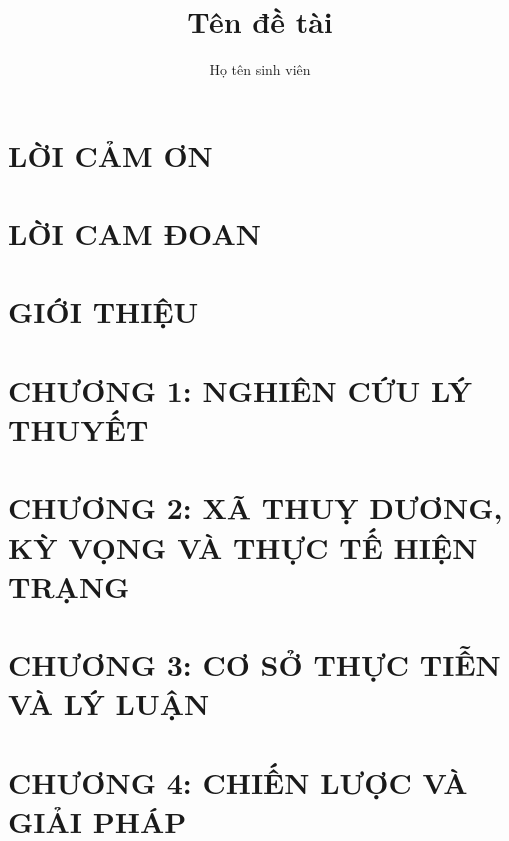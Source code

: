 \documentclass[a4paper,14pt,oneside]{extreport}
\title{Tên đề tài}						%
\author{Họ tên sinh viên}				%
\begin{document}
\restoregeometry


\chapter{LỜI CẢM ƠN}


\chapter{LỜI CAM ĐOAN}


\tableofcontents
\listoffigures
\listoftables

\clearpage
{}			%
\chapter{GIỚI THIỆU}


\chapter{CHƯƠNG 1: NGHIÊN CỨU LÝ THUYẾT}

\chapter{CHƯƠNG 2: XÃ THUỴ DƯƠNG, KỲ VỌNG VÀ THỰC TẾ HIỆN TRẠNG }


\chapter{CHƯƠNG 3: CƠ SỞ THỰC TIỄN VÀ LÝ LUẬN }


\chapter{CHƯƠNG 4: CHIẾN LƯỢC VÀ GIẢI PHÁP }


{}

\end{document}
